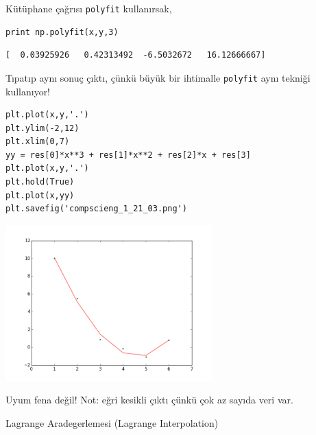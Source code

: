 \documentclass[12pt,fleqn]{article}\usepackage{../../common}
\begin{document}
Kütüphane çağrısı \verb!polyfit! kullanırsak,

\begin{verbatim}
print np.polyfit(x,y,3)
\end{verbatim}

\begin{verbatim}
[  0.03925926   0.42313492  -6.5032672   16.12666667]
\end{verbatim}

Tıpatıp aynı sonuç çıktı, çünkü büyük bir ihtimalle \verb!polyfit! aynı
tekniği kullanıyor! 

\begin{verbatim}
plt.plot(x,y,'.')
plt.ylim(-2,12)
plt.xlim(0,7)
yy = res[0]*x**3 + res[1]*x**2 + res[2]*x + res[3]
plt.plot(x,y,'.')
plt.hold(True)
plt.plot(x,yy)
plt.savefig('compscieng_1_21_03.png')
\end{verbatim}

\includegraphics[height=6cm]{compscieng_1_21_03.png}

Uyum fena değil! Not: eğri kesikli çıktı çünkü çok az sayıda veri var. 

Lagrange Aradegerlemesi (Lagrange Interpolation)
\end{document}
